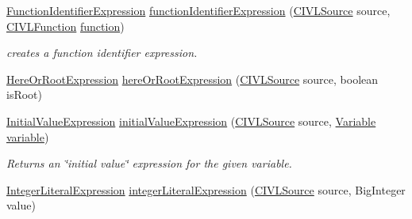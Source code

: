 \begin{DoxyCompactItemize}
\hyperlink{interfaceedu_1_1udel_1_1cis_1_1vsl_1_1civl_1_1model_1_1IF_1_1expression_1_1FunctionIdentifierExpression}{Function\+Identifier\+Expression} \hyperlink{interfaceedu_1_1udel_1_1cis_1_1vsl_1_1civl_1_1model_1_1IF_1_1ModelFactory_a16bcbfc15efe879be08c73a2d26d06e8}{function\+Identifier\+Expression} (\hyperlink{interfaceedu_1_1udel_1_1cis_1_1vsl_1_1civl_1_1model_1_1IF_1_1CIVLSource}{C\+I\+V\+L\+Source} source, \hyperlink{interfaceedu_1_1udel_1_1cis_1_1vsl_1_1civl_1_1model_1_1IF_1_1CIVLFunction}{C\+I\+V\+L\+Function} \hyperlink{interfaceedu_1_1udel_1_1cis_1_1vsl_1_1civl_1_1model_1_1IF_1_1ModelFactory_af44a1cdc35eba3261ad20baa1063b7c8}{function})
\begin{DoxyCompactList}\small\item\em creates a function identifier expression. \end{DoxyCompactList}\item 
\hyperlink{interfaceedu_1_1udel_1_1cis_1_1vsl_1_1civl_1_1model_1_1IF_1_1expression_1_1HereOrRootExpression}{Here\+Or\+Root\+Expression} \hyperlink{interfaceedu_1_1udel_1_1cis_1_1vsl_1_1civl_1_1model_1_1IF_1_1ModelFactory_ab127b8df71f70c1dbbd843c2f0fbcfdf}{here\+Or\+Root\+Expression} (\hyperlink{interfaceedu_1_1udel_1_1cis_1_1vsl_1_1civl_1_1model_1_1IF_1_1CIVLSource}{C\+I\+V\+L\+Source} source, boolean is\+Root)
\item 
\hyperlink{interfaceedu_1_1udel_1_1cis_1_1vsl_1_1civl_1_1model_1_1IF_1_1expression_1_1InitialValueExpression}{Initial\+Value\+Expression} \hyperlink{interfaceedu_1_1udel_1_1cis_1_1vsl_1_1civl_1_1model_1_1IF_1_1ModelFactory_a0ce9580dfde2e8cf15469a3b339e50c2}{initial\+Value\+Expression} (\hyperlink{interfaceedu_1_1udel_1_1cis_1_1vsl_1_1civl_1_1model_1_1IF_1_1CIVLSource}{C\+I\+V\+L\+Source} source, \hyperlink{interfaceedu_1_1udel_1_1cis_1_1vsl_1_1civl_1_1model_1_1IF_1_1variable_1_1Variable}{Variable} \hyperlink{interfaceedu_1_1udel_1_1cis_1_1vsl_1_1civl_1_1model_1_1IF_1_1ModelFactory_a173a1c077dcd3e6f69566bedbc76c51b}{variable})
\begin{DoxyCompactList}\small\item\em Returns an \char`\"{}initial value\char`\"{} expression for the given variable. \end{DoxyCompactList}\item 
\hyperlink{interfaceedu_1_1udel_1_1cis_1_1vsl_1_1civl_1_1model_1_1IF_1_1expression_1_1IntegerLiteralExpression}{Integer\+Literal\+Expression} \hyperlink{interfaceedu_1_1udel_1_1cis_1_1vsl_1_1civl_1_1model_1_1IF_1_1ModelFactory_a8a5fa768fae92e9d0506f7b4938a1476}{integer\+Literal\+Expression} (\hyperlink{interfaceedu_1_1udel_1_1cis_1_1vsl_1_1civl_1_1model_1_1IF_1_1CIVLSource}{C\+I\+V\+L\+Source} source, Big\+Integer value)

\end{DoxyCompactItemize}

